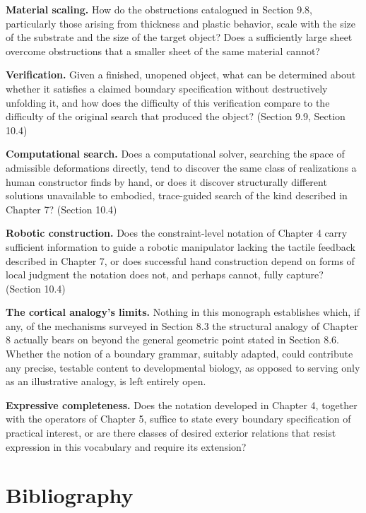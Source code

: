 \documentclass[11pt,oneside]{book}
\begin{document}
\textbf{Material scaling.} How do the obstructions catalogued in Section
9.8, particularly those arising from thickness and plastic behavior,
scale with the size of the substrate and the size of the target object?
Does a sufficiently large sheet overcome obstructions that a smaller
sheet of the same material cannot?

\textbf{Verification.} Given a finished, unopened object, what can be
determined about whether it satisfies a claimed boundary specification
without destructively unfolding it, and how does the difficulty of this
verification compare to the difficulty of the original search that
produced the object? (Section 9.9, Section 10.4)

\textbf{Computational search.} Does a computational solver, searching
the space of admissible deformations directly, tend to discover the same
class of realizations a human constructor finds by hand, or does it
discover structurally different solutions unavailable to embodied,
trace-guided search of the kind described in Chapter 7? (Section 10.4)

\textbf{Robotic construction.} Does the constraint-level notation of
Chapter 4 carry sufficient information to guide a robotic manipulator
lacking the tactile feedback described in Chapter 7, or does successful
hand construction depend on forms of local judgment the notation does
not, and perhaps cannot, fully capture? (Section 10.4)

\textbf{The cortical analogy's limits.} Nothing in this monograph
establishes which, if any, of the mechanisms surveyed in Section 8.3 the
structural analogy of Chapter 8 actually bears on beyond the general
geometric point stated in Section 8.6. Whether the notion of a boundary
grammar, suitably adapted, could contribute any precise, testable
content to developmental biology, as opposed to serving only as an
illustrative analogy, is left entirely open.

\textbf{Expressive completeness.} Does the notation developed in Chapter
4, together with the operators of Chapter 5, suffice to state every
boundary specification of practical interest, or are there classes of
desired exterior relations that resist expression in this vocabulary and
require its extension?

\backmatter

\hypertarget{bibliography}{%
\chapter*{Bibliography}
\label{bibliography}}
\end{document}
